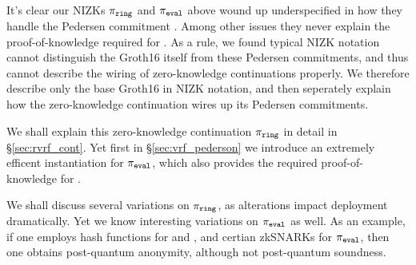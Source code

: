 It's clear our NIZKs $\pi_{\mathtt{ring}}$ and $\pi_{\mathtt{eval}}$ above wound up underspecified
in how they handle the Pedersen commitment \compk.  Among other issues
they never explain the proof-of-knowledge required for \compk.
As a rule, we found typical NIZK notation cannot distinguish the Groth16
itself from these Pedersen commitments, and thus cannot describe the
wiring of zero-knowledge continuations properly.
We therefore describe only the base Groth16 in NIZK notation, and then
seperately explain how the zero-knowledge continuation wires up its
Pedersen commitments.

We shall explain this zero-knowledge continuation $\pi_{\mathtt{ring}}$ in detail
in \S\ref{sec:rvrf_cont}.  Yet first in \S\ref{sec:vrf_pederson}
we introduce an extremely efficent instantiation for $\pi_{\mathtt{eval}}$, which
also provides the required proof-of-knowledge for \compk.

We shall discuss several variations on $\pi_{\mathtt{ring}}$, as alterations impact
deployment dramatically.  Yet we know interesting variations on $\pi_{\mathtt{eval}}$
as well.  As an example, if one employs hash functions for \CommitKey
and \PRF, and certian zkSNARKs for $\pi_{\mathtt{eval}}$, then one obtains post-quantum
anonymity, although not post-quantum soundness.


